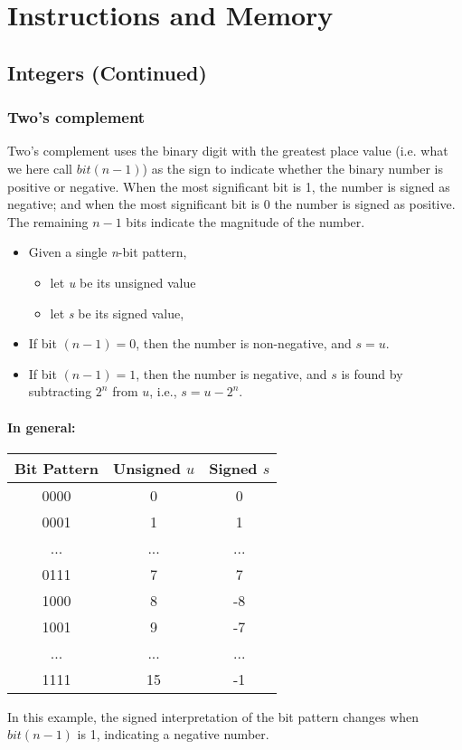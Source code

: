 \documentclass[12pt]{article}
\begin{document}
\newpage
\section{Instructions and Memory}

\subsection{Integers (Continued)}

\subsubsection{Two's complement}
Two's complement uses the binary digit with the greatest place value (i.e. what we here call $bit(n-1)$) as the sign to indicate whether the binary number is positive or negative. When the most significant bit is 1, the number is signed as negative; and when the most significant bit is 0 the number is signed as positive.\\
The remaining \(n-1\) bits indicate the magnitude of the number.
\begin{itemize}
    \item Given a single \textit{n}-bit pattern,
    \begin{itemize}
        \item let \textit{u} be its unsigned value
        \item let \textit{s} be its signed value,
    \end{itemize}
    \item If bit $(n - 1) = 0$, then the number is non-negative, and \( s = u \).
    \item If bit $(n - 1) = 1$, then the number is negative, and \( s \) is found by subtracting \( 2^n \) from \( u \), i.e., \( s = u - 2^n \).
\end{itemize}

\paragraph{In general:}

\begin{center}
\begin{tabular}{|c|c|c|}
\hline
\rowcolor[gray]{0.9} Bit Pattern & Unsigned \( u \) & Signed \( s \) \\
\hline
0000 & 0 & 0 \\
\hline
0001 & 1 & 1 \\
\hline
... & ... & ... \\
\hline
0111 & 7 & 7 \\
\hline
1000 & 8 & -8 \\
\hline
1001 & 9 & -7 \\
\hline
... & ... & ... \\
\hline
1111 & 15 & -1 \\
\hline
\end{tabular}
\end{center}
In this example, the signed interpretation of the bit pattern changes when \(bit(n-1)\) is 1, indicating a negative number.\\
\end{document}
